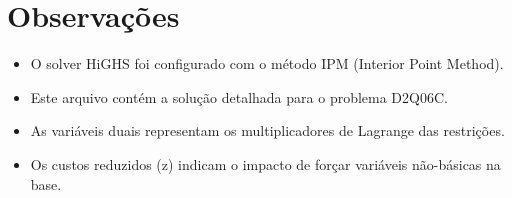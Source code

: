 \documentclass[12pt]{article}
\begin{document}
\section{Observações}

\begin{itemize}
\item O solver HiGHS foi configurado com o método IPM (Interior Point Method).
\item Este arquivo contém a solução detalhada para o problema D2Q06C.
\item As variáveis duais representam os multiplicadores de Lagrange das restrições.
\item Os custos reduzidos (z) indicam o impacto de forçar variáveis não-básicas na base.
\end{itemize}
\end{document}
